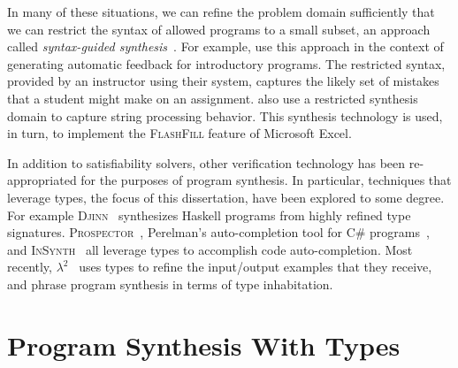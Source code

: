 In many of these situations, we can refine the problem domain sufficiently that we can restrict the syntax of allowed programs to a small subset, an approach called \emph{syntax-guided synthesis}~\citep{alur-fmcad-2013}.
For example, \citet{singh-pldi-2013} use this approach in the context of generating automatic feedback for introductory programs.
The restricted syntax, provided by an instructor using their system, captures the likely set of mistakes that a student might make on an assignment.
\citet{gulwani-popl-2011} also use a restricted synthesis domain to capture string processing behavior.
This synthesis technology is used, in turn, to implement the \textsc{FlashFill} feature of Microsoft Excel.

In addition to satisfiability solvers, other verification technology has been re-appropriated for the purposes of program synthesis.
In particular, techniques that leverage types, the focus of this dissertation, have been explored to some degree.
For example \textsc{Djinn}~\citep{augustsson-2004} synthesizes Haskell programs from highly refined type signatures.
\textsc{Prospector}~\citep{mandelin-pldi-2005}, Perelman's auto-completion tool for C\# programs~\citep{perelman-pldi-2012}, and \textsc{InSynth}~\citep{gvero-pldi-2013} all leverage types to accomplish code auto-completion.
Most recently, $λ^2$~\citep{feser-pldi-2015} uses types to refine the input/output examples that they receive, and \citet{scherer-icfp-2015} phrase program synthesis in terms of type inhabitation.

\section{Program Synthesis With Types}

